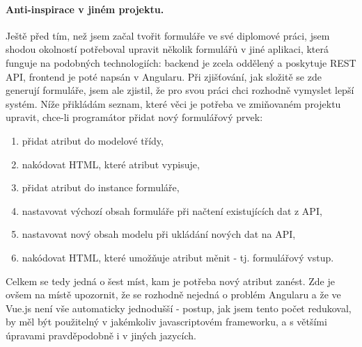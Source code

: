 \paragraph{Anti-inspirace v jiném projektu.} Ještě před tím, než jsem začal tvořit formuláře ve své diplomové práci, jsem shodou okolností potřeboval upravit několik formulářů v jiné aplikaci, která funguje na podobných technologiích: backend je zcela oddělený a poskytuje REST API, frontend je poté napsán v Angularu. Při zjišťování, jak složitě se zde generují formuláře, jsem ale zjistil, že pro svou práci chci rozhodně vymyslet lepší systém. Níže přikládám seznam, které věci je potřeba ve zmiňovaném projektu upravit, chce-li programátor přidat nový formulářový prvek:

\begin{enumerate}
    \item přidat atribut do modelové třídy,
    \item nakódovat HTML, které atribut vypisuje,
    \item přidat atribut do instance formuláře,
    \item nastavovat výchozí obsah formuláře při načtení existujících dat z API,
    \item nastavovat nový obsah modelu při ukládání nových dat na API,
    \item nakódovat HTML, které umožňuje atribut měnit - tj. formulářový vstup.
\end{enumerate}

Celkem se tedy jedná o šest míst, kam je potřeba nový atribut zanést. Zde je ovšem na místě upozornit, že se rozhodně nejedná o problém Angularu a že ve Vue.js není vše automaticky jednodušší - postup, jak jsem tento počet redukoval, by měl být použitelný v jakémkoliv javascriptovém frameworku, a s většími úpravami pravděpodobně i v jiných jazycích.\\

